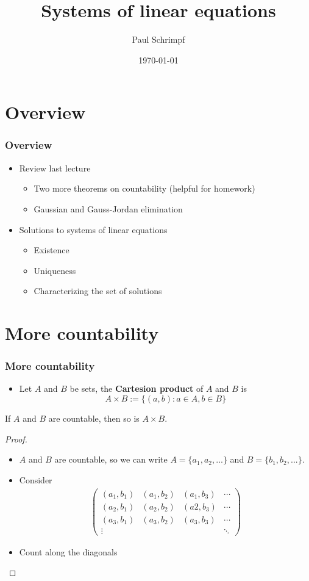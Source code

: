 \documentclass[compress]{beamer}
\title{Systems of linear equations}
\author{Paul Schrimpf}
\institute{UBC \\ Economics 526}
\date{\today}
\begin{document}
\frame{\titlepage}

\section{Overview}

\begin{frame}
  \frametitle{Overview}
  \begin{itemize}
  \item Review last lecture
    \begin{itemize}
    \item Two more theorems on countability (helpful for homework) 
    \item Gaussian and Gauss-Jordan elimination
    \end{itemize}
  \item Solutions to systems of linear equations
    \begin{itemize}
    \item Existence
    \item Uniqueness
    \item Characterizing the set of solutions
    \end{itemize}
  \end{itemize}
\end{frame}

\section{More countability}
\begin{frame}
  \frametitle{More countability}
  \begin{itemize}
  \item Let $A$ and $B$ be sets, the \textbf{Cartesion product} of $A$
    and $B$ is
    \[ A \times B := \{(a, b) : a \in A, b \in B\} \]
  \end{itemize}
  \begin{theorem}
    If $A$ and $B$ are countable, then so is $A \times B$.
  \end{theorem}
  \begin{proof}
    \begin{itemize}
    \item $A$ and $B$ are countable, so we can write $A = \{a_1, a_2,
      ...\}$ and $B = \{b_1, b_2, ... \}$.
    \item Consider 
      \begin{align*}
        \begin{pmatrix} 
          (a_1, b_1) & (a_1, b_2) & (a_1, b_3) & \cdots \\
          (a_2, b_1) & (a_2, b_2) & (a2, b_3) & \cdots \\
          (a_3, b_1) & (a_3, b_2) & (a_3, b_3) & \cdots \\
          \vdots &               &           & \ddots
        \end{pmatrix}
      \end{align*}
    \item Count along the diagonals
    \end{itemize}
  \end{proof}  
\end{frame}
\end{document}
